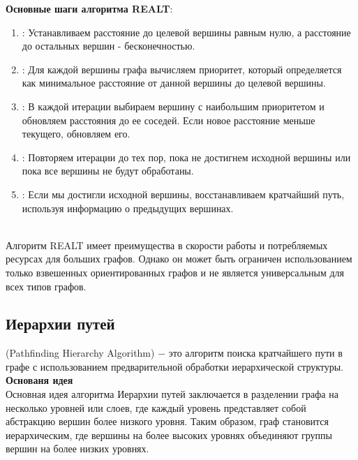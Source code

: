         \textbf{Основные шаги алгоритма REALT}:
        \begin{enumerate}
            \item {}: Устанавливаем расстояние до целевой вершины равным нулю, а расстояние до остальных вершин - бесконечностью.
            \item {}: Для каждой вершины графа вычисляем приоритет, который определяется как минимальное расстояние от данной вершины до целевой вершины.
            \item {}: В каждой итерации выбираем вершину с наибольшим приоритетом и обновляем расстояния до ее соседей. Если новое расстояние меньше текущего, обновляем его.
            \item {}: Повторяем итерации до тех пор, пока не достигнем исходной вершины или пока все вершины не будут обработаны.
            \item {}: Если мы достигли исходной вершины, восстанавливаем кратчайший путь, используя информацию о предыдущих вершинах.
        \end{enumerate}\\

        Алгоритм REALT имеет преимущества в скорости работы и потребляемых ресурсах для больших графов. Однако он может быть ограничен использованием только взвешенных ориентированных графов и не является универсальным для всех типов графов.
    \subsection{Иерархии путей}
         (Pathfinding Hierarchy Algorithm) $-$ это алгоритм поиска кратчайшего пути в графе с использованием предварительной обработки иерархической структуры.\\

        \textbf{Основаня идея}\\
        Основная идея алгоритма Иерархии путей заключается в разделении графа на несколько уровней или слоев, где каждый уровень представляет собой абстракцию вершин более низкого уровня. Таким образом, граф становится иерархическим, где вершины на более высоких уровнях объединяют группы вершин на более низких уровнях.\\

